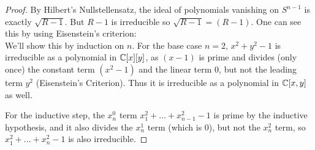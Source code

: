\documentclass{amsart}
\begin{document}
\begin{proof}
	By Hilbert's Nullstellensatz, the ideal of polynomials vanishing on $S^{n-1}$ is exactly $\sqrt{R-1}$. But $R-1$ is irreducible so $\sqrt{R-1}=(R-1)$. One can see this by using Eisenstein's criterion:\\
	
	We'll show this by induction on $n$. For the base case $n=2$, $x^2+y^2 - 1$ is irreducible as a polynomial in $\mathbb{C}[x][y]$, as $(x-1)$ is prime and divides (only once) the constant term $(x^2-1)$ and the linear term $0$, but not the leading term $y^2$ (Eisenstein's Criterion). Thus it is irreducible as a polynomial in $\mathbb{C}[x,y]$ as well.
	
	For the inductive step, the $x_n^0$ term $x_1^2+\dots+x_{n-1}^2-1$ is prime by the inductive hypothesis, and it also divides the $x_n^1$ term (which is 0), but not the $x_n^2$ term, so $x_1^2+\dots+x_n^2-1$ is also irreducible.
\end{proof} 
		 
\end{document}
